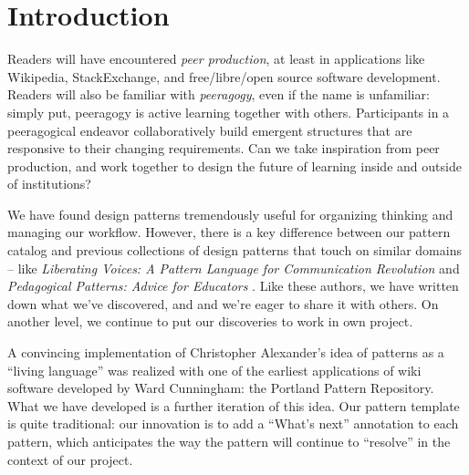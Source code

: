 
\section{Introduction}\label{sec:Introduction}

Readers will have encountered \emph{peer production}, at least in applications like Wikipedia, StackExchange, and free/libre/open source software development.   
%
Readers will also be familiar with \emph{peeragogy}, even if the name is unfamiliar: simply put, peeragogy is active learning together with others.  Participants in a peeragogical endeavor collaboratively build emergent  structures that are responsive to their changing requirements.
%
Can we take inspiration from peer production, and work together to design the future of learning inside and outside of institutions?



We have found design patterns tremendously useful for organizing thinking and managing our workflow.  However, there is a key difference between our pattern catalog and previous collections of design patterns that touch on similar domains -- like \emph{Liberating Voices: A Pattern Language for Communication Revolution} \cite{schuler2008liberating} and \emph{Pedagogical Patterns: Advice for Educators} \cite{bergin2012pedagogical}.
%
Like these authors, we have written down what we've discovered, and and we're eager to share it with others.  On another level, we continue to put our discoveries to work in own project.



A convincing implementation of Christopher Alexander’s idea of patterns as a ``living language'' \cite[p.~xvii]{alexander1977pattern} was realized with one of the earliest applications of wiki software developed by Ward Cunningham: the Portland Pattern Repository.  What we have developed is a further iteration of this idea.   Our pattern template is quite traditional: our innovation is to add a ``What's next'' annotation to each pattern, which anticipates the way the pattern will continue to ``resolve'' in the context of our project. 


